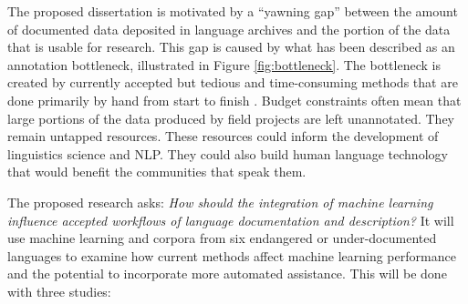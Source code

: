 The proposed dissertation is motivated by a “yawning gap” \citep{seifart_language_2018} between the amount of documented data deposited in language archives and the portion of the data that is usable for research. This gap is caused by what has been described as an annotation bottleneck, illustrated in Figure \ref{fig:bottleneck}. The bottleneck is created by currently accepted but tedious and time-consuming methods that are done primarily by hand from start to finish \citep{simons_worlds_2013,holton_developing_2017}. 
Budget constraints often mean that large portions of the data produced by field projects are left unannotated. They remain untapped resources. These resources could inform the development of linguistics science and NLP. They could also build human language technology that would benefit the communities that speak them. 

The proposed research asks: \emph{How should the integration of machine learning  influence accepted workflows of language documentation and description?} It will use machine learning and corpora from six endangered or under-documented languages to  
examine how current methods affect machine learning performance and the potential to incorporate more automated assistance. This will be done with three studies:

